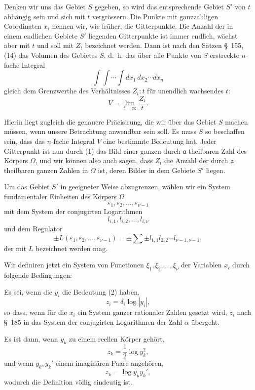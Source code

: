 \documentclass[11pt]{article}
\begin{document}
Denken wir uns das Gebiet $S$ gegeben, so wird das entsprechende Gebiet $S'$ von $t$ abhängig sein und sich mit $t$ vergrössern. Die Punkte mit ganzzahligen Coordinaten $x_i$ nennen wir, wie früher, die Gitterpunkte. Die Anzahl der in einem endlichen Gebiete $S'$ liegenden Gitterpunkte ist immer endlich, wächst aber mit $t$ und soll mit $Z_t$ bezeichnet werden. Dann ist nach den Sätzen \S~155, (14) das Volumen des Gebietes $S$, d.~h. das über alle Punkte von $S$ erstreckte $n$-fache Integral
\[
\int\!\int\cdots\int dx_1\,dx_2\cdots dx_n
\]
gleich dem Grenzwerthe des Verhältnisses $Z_t:t$ für unendlich wachsendes $t$:
\begin{equation}
V=\lim_{t=\infty}\frac{Z_t}{t}.
\tag{5}
\end{equation}

Hierin liegt zugleich die genauere Präcisirung, die wir über das Gebiet $S$ machen müssen, wenn unsere Betrachtung anwendbar sein soll. Es muss $S$ so beschaffen sein, dass das $n$-fache Integral $V$ eine bestimmte Bedeutung hat. Jeder Gitterpunkt ist nun durch (1) das Bild einer ganzen durch $\mathfrak a$ theilbaren Zahl des Körpers $\Omega$, und wir können also auch sagen, dass $Z_t$ die Anzahl der durch $\mathfrak a$ theilbaren ganzen Zahlen in $\Omega$ ist, deren Bilder in dem Gebiete $S'$ liegen.

Um das Gebiet $S'$ in geeigneter Weise abzugrenzen, wählen wir ein System fundamentaler Einheiten des Körpers $\Omega$
\[
\varepsilon_1,\varepsilon_2,\ldots,\varepsilon_{\nu-1}
\]
mit dem System der conjugirten Logarithmen
\[
l_{i,1},l_{i,2},\ldots,l_{i,\nu}
\]
und dem Regulator
\begin{equation}
\pm L(\varepsilon_1,\varepsilon_2,\ldots,\varepsilon_{\nu-1})=\pm\sum\pm l_{1,1}l_{2,2}\cdots l_{\nu-1,\nu-1},
\tag{6}
\end{equation}
der mit $L$ bezeichnet werden mag.

Wir definiren jetzt ein System von Functionen $\xi_1,\xi_2,\ldots,\xi_\nu$ der Variablen $x_i$ durch folgende Bedingungen:

Es sei, wenn die $y_i$ die Bedeutung (2) haben,
\begin{equation}
z_i=\delta_i\log|y_i|,
\tag{7}
\end{equation}
so dass, wenn für die $x_i$ ein System ganzer rationaler Zahlen gesetzt wird, $z_i$ nach \S~185 in das System der conjugirten Logarithmen der Zahl $\alpha$ übergeht.

Es ist dann, wenn $y_k$ zu einem reellen Körper gehört,
\begin{equation}
z_k=\frac12\log y_k^2,
\tag{8}
\end{equation}
und wenn $y_k,y_k'$ einem imaginären Paare angehören,
\begin{equation}
z_k=\log y_ky_k',
\tag{9}
\end{equation}
wodurch die Definition völlig eindeutig ist.
\end{document}
